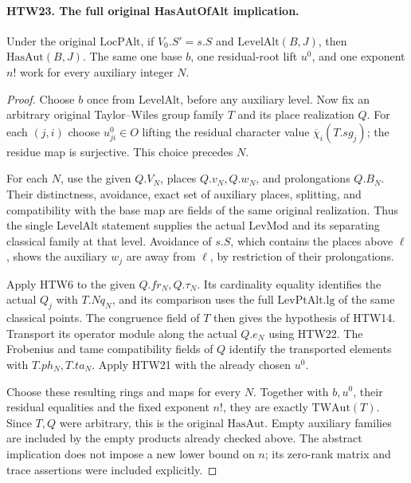 \documentclass[11pt,a4paper]{article}
\numberwithin{equation}{section}
\theoremstyle{remark}\newtheorem{remark}[theorem]{Remark}
\begin{document}
\paragraph{HTW23. The full original HasAutOfAlt implication.}
\label{claim:HTW23}
Under the original \(\mathrm{LocPAlt}\), if
\(V_0.S'=s.S\) and \(\mathrm{LevelAlt}(B,J)\),
then \(\mathrm{HasAut}(B,J)\).  The same one
base \(b\), one residual-root lift \(u^0\), and
one exponent \(n!\) work for every auxiliary
integer \(N\).
\begin{proof}
Choose \(b\) once from \(\mathrm{LevelAlt}\),
before any auxiliary level.  Now fix an arbitrary
original Taylor--Wiles group family \(T\) and its
place realization \(Q\).  For each \((j,i)\)
choose \(u^0_{ji}\in O\) lifting the residual
character value \(\overline\chi_i(T.sg_j)\);
the residue map is surjective.  This choice
precedes \(N\).

For each \(N\), use the given \(Q.V_N\),
places \(Q.v_N,Q.w_N\), and prolongations \(Q.B_N\).
Their distinctness, avoidance, exact set of
auxiliary places, splitting, and compatibility
with the base map are fields of the same
original realization.  Thus the single
\(\mathrm{LevelAlt}\) statement supplies the
actual \(\mathrm{LevMod}\) and its separating
classical family at that level.  Avoidance of
\(s.S\), which contains the places above \(\ell\),
shows the auxiliary \(w_j\) are away from
\(\ell\), by restriction of their prolongations.

Apply HTW6 to the given \(Q.fr_N,Q.\tau_N\).
Its cardinality equality identifies the actual
\(Q_j\) with \(T.Nq_N\), and its comparison uses
the full \(\mathrm{LevPtAlt.lg}\) of the same
classical points.  The congruence field of \(T\)
then gives the hypothesis of HTW14.
Transport its operator module along the actual
\(Q.e_N\) using HTW22.  The Frobenius and tame
compatibility fields of \(Q\) identify the
transported elements with \(T.ph_N,T.ta_N\).
Apply HTW21 with the already chosen \(u^0\).

Choose these resulting rings and maps for every
\(N\).  Together with \(b,u^0\), their residual
equalities and the fixed exponent \(n!\), they
are exactly \(\mathrm{TWAut}(T)\).  Since \(T,Q\)
were arbitrary, this is the original
\(\mathrm{HasAut}\).  Empty auxiliary families
are included by the empty products already
checked above.  The abstract implication does
not impose a new lower bound on \(n\); its
zero-rank matrix and trace assertions were
included explicitly.
\end{proof}
\end{document}
